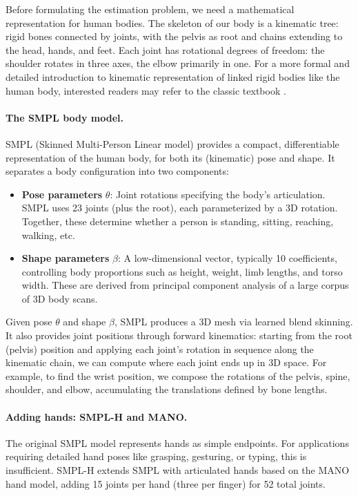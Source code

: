 Before formulating the estimation problem, we need a mathematical
representation for human bodies. The skeleton of our body is a
kinematic tree: rigid bones connected by joints, with the pelvis as
root and chains extending to the head, hands, and feet. Each joint
has rotational degrees of freedom: the shoulder rotates in three
axes, the elbow primarily in one. For a more formal and detailed
introduction to kinematic representation of linked rigid bodies like
the human body, interested readers may refer to the classic textbook
\cite{MurrayR1994}.

\paragraph{The SMPL body model.}
SMPL (Skinned Multi-Person Linear model) \citep{loper2015smpl}
provides a compact, differentiable representation of the human body,
for both its (kinematic) pose and shape. It separates a body
configuration into two components:
\begin{itemize}
    \item \textbf{Pose parameters} $\theta$: Joint rotations
        specifying the body's articulation. SMPL uses 23 joints (plus
        the root), each parameterized by a 3D rotation. Together,
        these determine whether a person is standing, sitting,
        reaching, walking, etc.
    \item \textbf{Shape parameters} $\beta$: A low-dimensional
        vector, typically 10 coefficients, controlling body
        proportions such as height, weight, limb lengths, and torso
        width. These are derived from principal component analysis of
        a large corpus of 3D body scans.
\end{itemize}

Given pose $\theta$ and shape $\beta$, SMPL produces a 3D mesh via
learned blend skinning. It also provides joint positions through
forward kinematics: starting from the root (pelvis) position and
applying each joint's rotation in sequence along the kinematic chain,
we can compute where each joint ends up in 3D space. For example, to
find the wrist position, we compose the rotations of the pelvis,
spine, shoulder, and elbow, accumulating the translations defined by
bone lengths.

\paragraph{Adding hands: SMPL-H and MANO.}
The original SMPL model represents hands as simple endpoints. For
applications requiring detailed hand poses like grasping, gesturing,
or typing, this is insufficient. SMPL-H \citep{romero2017embodied}
extends SMPL with articulated hands based on the MANO hand model,
adding 15 joints per hand (three per finger) for 52 total joints.

